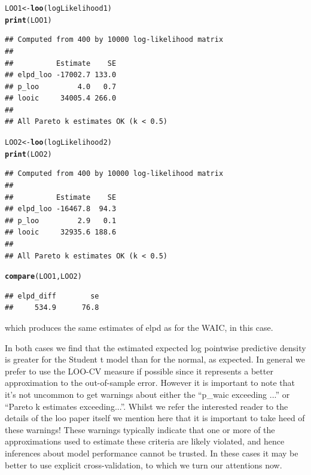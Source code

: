 \documentclass[11pt,fullpage]{book}
\makeatletter
\newenvironment{kframe}{%
	\def\at@end@of@kframe{}%
	\ifinner\ifhmode%
	\def\at@end@of@kframe{\end{minipage}}%
\begin{minipage}{\columnwidth}%
	\fi\fi%
	\def\FrameCommand##1{\hskip\@totalleftmargin \hskip-\fboxsep
		\colorbox{shadecolor}{##1}\hskip-\fboxsep
		\hskip-\linewidth \hskip-\@totalleftmargin \hskip\columnwidth}%
	\MakeFramed {\advance\hsize-\width
		\@totalleftmargin\z@ \linewidth\hsize
		\@setminipage}}%
{\par\unskip\endMakeFramed%
	\at@end@of@kframe}
\newcommand{\hlstd}[1]{\textcolor[rgb]{0.345,0.345,0.345}{#1}}%
\newcommand{\hlkwb}[1]{\textcolor[rgb]{0.69,0.353,0.396}{#1}}%
\newcommand{\hlkwd}[1]{\textcolor[rgb]{0.737,0.353,0.396}{\textbf{#1}}}%
\newenvironment{knitrout}{}{} %
\makeatother
\begin{document}
\begin{knitrout}\small
		\color{fgcolor}\begin{kframe}
\begin{alltt}
\hlstd{LOO1} \hlkwb{<-} \hlkwd{loo}\hlstd{(logLikelihood1)}
\hlkwd{print}\hlstd{(LOO1)}
\end{alltt}
\begin{verbatim}
## Computed from 400 by 10000 log-likelihood matrix
## 
##          Estimate    SE
## elpd_loo -17002.7 133.0
## p_loo         4.0   0.7
## looic     34005.4 266.0
## 
## All Pareto k estimates OK (k < 0.5)
\end{verbatim}

\begin{alltt}
\hlstd{LOO2} \hlkwb{<-} \hlkwd{loo}\hlstd{(logLikelihood2)}
\hlkwd{print}\hlstd{(LOO2)}
\end{alltt}
\begin{verbatim}
## Computed from 400 by 10000 log-likelihood matrix
## 
##          Estimate    SE
## elpd_loo -16467.8  94.3
## p_loo         2.9   0.1
## looic     32935.6 188.6
## 
## All Pareto k estimates OK (k < 0.5)
\end{verbatim}
\begin{alltt}
\hlkwd{compare}\hlstd{(LOO1,LOO2)}
\end{alltt}
\begin{verbatim}
## elpd_diff        se 
##     534.9      76.8
\end{verbatim}
		\end{kframe}
	\end{knitrout}

which produces the same estimates of elpd as for the WAIC, in this case.

In both cases we find that the estimated expected log pointwise predictive density is greater for the Student t model than for the normal, as expected. In general we prefer to use the LOO-CV measure if possible since it represents a better approximation to the out-of-sample error. However it is important to note that it's not uncommon to get warnings about either the ``p\_waic exceeding ...'' or ``Pareto k estimates exceeding...''. Whilst we refer the interested reader to the details of the loo paper itself \cite{vehtari2015efficient} we mention here that it is important to take heed of these warnings! These warnings typically indicate that one or more of the approximations used to estimate these criteria are likely violated, and hence inferences about model performance cannot be trusted. In these cases it may be better to use explicit cross-validation, to which we turn our attentions now.
\end{document}

